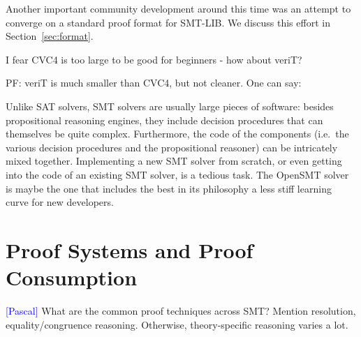 \documentclass{llncs}
\newcommand{\Note}[1]{\textcolor{blue}{[#1]}}
\begin{document}
Another important community development around this time was an attempt to
converge on a standard proof format for SMT-LIB.  We discuss this effort in
Section~\ref{sec:format}.



I fear CVC4 is too large to be good for beginners - how about veriT?

PF: veriT is much smaller than CVC4, but not cleaner.  One can say:

Unlike SAT solvers, SMT solvers are usually large pieces of software: besides
propositional reasoning engines, they include decision procedures that can
themselves be quite complex.  Furthermore, the code of the components (i.e.\ the
various decision procedures and the propositional reasoner) can be intricately
mixed together.  Implementing a new SMT solver from scratch, or even getting
into the code of an existing SMT solver, is a tedious task.  The OpenSMT
solver~\cite{} is maybe the one that includes the best in its philosophy a less
stiff learning curve for new developers.

\section{Proof Systems and Proof Consumption}

\Note{Pascal}
What are the common proof techniques across SMT?  Mention resolution,
equality/congruence reasoning.  Otherwise, theory-specific reasoning varies a lot.



\end{document}
